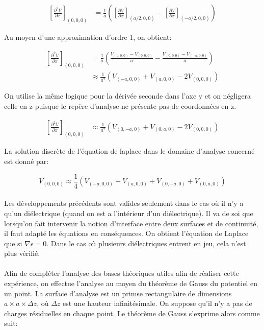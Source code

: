 \begin{align}
\left[ \frac{\partial^2 V}{\partial x}\right]_{(0,0,0)} &= \frac{1}{a}\left( \left[ \frac{\partial V}{\partial x}\right]_{(a/2,0,0)} - \left[ \frac{\partial V}{\partial x}\right]_{(-a/2,0,0)} \right)
\end{align}

Au moyen d'une approximation d'ordre 1, on obtient:

\begin{align}
\left[ \frac{\partial^2 V}{\partial x}\right]_{(0,0,0)} &= \frac{1}{a}\left( \frac{V_{(a,0,0)} - V_{(0,0,0)}}{a} - \frac{V_{(0,0,0)} - V_{(-a,0,0)}}{a} \right)\\
&\approx \frac{1}{a^2} \left( V_{(-a,0,0)} + V_{(a,0,0)} - 2 V_{(0,0,0)} \right)
\end{align}

On utilise la même logique pour la dérivée seconde dans l'axe y et on négligera celle en z puisque le repère d'analyse ne présente pas de coordonnées en z.
 
\begin{align}
\left[ \frac{\partial^2 V}{\partial x}\right]_{(0,0,0)} &\approx \frac{1}{a^2} \left( V_{(0,-a,0)} + V_{(0,a,0)} - 2 V_{(0,0,0)} \right)
\end{align}

La solution discrète de l'équation de laplace dans le domaine d'analyse concerné est donné par:

\begin{equation}
V_{(0,0,0)} \approx \frac{1}{4} \left(V_{(-a,0,0)} + V_{(a,0,0)} + V_{(0,-a,0)} + V_{(0,a,0)} \right)
\end{equation}

\paragraph{}Les développements précédents sont valides seulement dans le cas où il n'y a qu'un diélectrique (quand on est a l'intérieur d'un diélectrique). Il va de soi que lorsqu'on fait intervenir la notion d'interface entre deux surfaces et de continuité, il faut adapté les équations en conséquences. On obtient l'équation de Laplace que si $\nabla \epsilon = 0$. Dans le cas où plusieurs diélectriques entrent en jeu, cela n'est plus vérifié.  

\paragraph{}Afin de compléter l'analyse des bases théoriques utiles afin de réaliser cette expérience, on effectue l'analyse au moyen du théorème de Gauss du potentiel en un point. La surface d'analyse est un primse rectangulaire de dimensions $a \times a \times \Delta z $, où $\Delta z$ est une hauteur infinitésimale. On suppose qu'il n'y a pas de charges résiduelles en chaque point. Le théorème de Gauss s'exprime alors comme suit:

